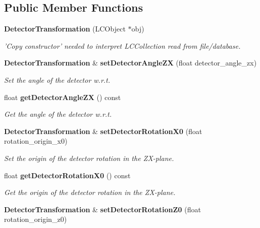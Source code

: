 \subsection*{Public Member Functions}
\begin{DoxyCompactItemize}
\item 
{\bf Detector\-Transformation} (L\-C\-Object $\ast$obj)\label{classCALICE_1_1DetectorTransformation_aa0cecf48097264a6a6cc0af071008d0b}

\begin{DoxyCompactList}\small\item\em 'Copy constructor' needed to interpret L\-C\-Collection read from file/database. \end{DoxyCompactList}\item 
{\bf Detector\-Transformation} \& {\bf set\-Detector\-Angle\-Z\-X} (float detector\-\_\-angle\-\_\-zx)
\begin{DoxyCompactList}\small\item\em Set the angle of the detector w.\-r.\-t. \end{DoxyCompactList}\item 
float {\bf get\-Detector\-Angle\-Z\-X} () const 
\begin{DoxyCompactList}\small\item\em Get the angle of the detector w.\-r.\-t. \end{DoxyCompactList}\item 
{\bf Detector\-Transformation} \& {\bf set\-Detector\-Rotation\-X0} (float rotation\-\_\-origin\-\_\-x0)\label{classCALICE_1_1DetectorTransformation_a2eef8fc060f0844f2c58dd406e236dcf}

\begin{DoxyCompactList}\small\item\em Set the origin of the detector rotation in the Z\-X-\/plane. \end{DoxyCompactList}\item 
float {\bf get\-Detector\-Rotation\-X0} () const \label{classCALICE_1_1DetectorTransformation_afcbf82cfdf8f7e59f8eb9d0dbbcacaf2}

\begin{DoxyCompactList}\small\item\em Get the origin of the detector rotation in the Z\-X-\/plane. \end{DoxyCompactList}\item 
{\bf Detector\-Transformation} \& {\bf set\-Detector\-Rotation\-Z0} (float rotation\-\_\-origin\-\_\-z0)\label{classCALICE_1_1DetectorTransformation_aec6ee5baab95ce9cb39df88ca04e0e80}


\end{DoxyCompactItemize}

